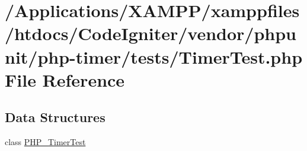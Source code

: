 \hypertarget{_timer_test_8php}{}\section{/\+Applications/\+X\+A\+M\+P\+P/xamppfiles/htdocs/\+Code\+Igniter/vendor/phpunit/php-\/timer/tests/\+Timer\+Test.php File Reference}
\label{_timer_test_8php}
\subsection*{Data Structures}
\begin{DoxyCompactItemize}
\item 
class \mbox{\hyperlink{class_p_h_p___timer_test}{P\+H\+P\+\_\+\+Timer\+Test}}
\end{DoxyCompactItemize}
